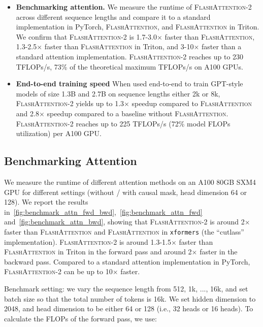 \begin{itemize}[itemsep=0.1pt,topsep=0pt,leftmargin=*]
  \item \textbf{Benchmarking attention.} We measure the runtime of \textsc{FlashAttention-2} across different sequence lengths and compare it to a standard implementation in PyTorch, \textsc{FlashAttention}, and
  \textsc{FlashAttention} in Triton. We confirm that \textsc{FlashAttention-2} is 1.7-3.0$\times$ faster than \textsc{FlashAttention}, 1.3-2.5$\times$
  faster than \textsc{FlashAttention} in Triton, and 3-10$\times$ faster than a standard attention implementation.
  \textsc{FlashAttention-2} reaches up to 230 TFLOPs/s, 73\% of the theoretical maximum TFLOPs/s on A100 GPUs.
  \item \textbf{End-to-end training speed} When used end-to-end to train GPT-style models of size 1.3B and 2.7B on sequence lengths either 2k or 8k, \textsc{FlashAttention-2} yields up to 1.3$\times$ speedup compared to
  \textsc{FlashAttention} and 2.8$\times$ speedup compared to a baseline without \textsc{FlashAttention}.
  \textsc{FlashAttention-2} reaches up to 225 TFLOPs/s (72\% model FLOPs utilization) per A100 GPU.
\end{itemize}

\subsection{Benchmarking Attention}
\label{subsec:benchmark_attn}

We measure the runtime of different attention methods on an A100 80GB SXM4 GPU for different settings (without / with causal mask, head dimension 64 or 128). We report the results
in~\ref{fig:benchmark_attn_fwd_bwd},~\ref{fig:benchmark_attn_fwd}
and~\ref{fig:benchmark_attn_bwd}, showing that \textsc{FlashAttention-2} is around 2$\times$ faster than \textsc{FlashAttention} and \textsc{FlashAttention} in \texttt{xformers} (the ``cutlass'' implementation).
\textsc{FlashAttention-2} is around 1.3-1.5$\times$ faster than \textsc{FlashAttention} in Triton in the forward pass and around 2$\times$ faster in the backward pass. Compared to a standard attention implementation in PyTorch, \textsc{FlashAttention-2} can be up to 10$\times$ faster.

Benchmark setting: we vary the sequence length from 512, 1k, ..., 16k, and set batch size so that the total number of tokens is 16k. We set hidden dimension to 2048, and head dimension to be either 64 or 128 (i.e., 32 heads or 16 heads). To calculate the FLOPs of the forward pass, we use:

